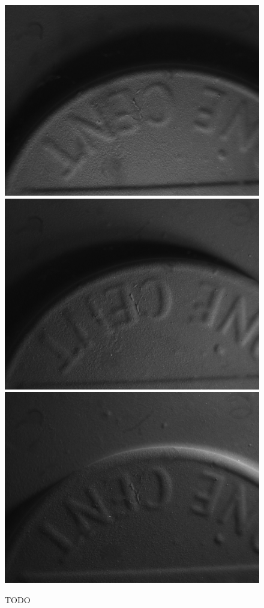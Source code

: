 \documentclass[10pt,twocolumn,letterpaper]{article}
\begin{document}
\begin{figure}[ht]
\includegraphics[width=\textwidth]{images/coin4.png}
\endminipage\hfill
{}
\includegraphics[width=\textwidth]{images/coin5.png}
\endminipage\hfill
{}
\includegraphics[width=\textwidth]{images/coin6.png}
\endminipage\\

\caption{TODO}
\end{figure}
\end{document}
